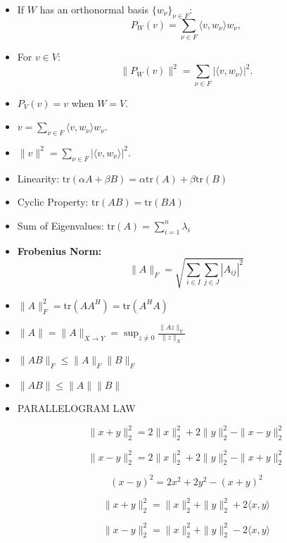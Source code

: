 \documentclass{article}
\begin{document}
\begin{itemize}
 \item If \( W \) has an orthonormal basis \( \{ w_\nu \}_{\nu \in F} \):
    \[
    P_W(v) = \sum_{\nu \in F} \langle v, w_\nu \rangle w_\nu,
    \]

 \item For \( v \in V \):
    \[
    \| P_W(v) \|^2 = \sum_{\nu \in F} |\langle v, w_\nu \rangle|^2.
    \]

 \item $P_V(v) = v$ when $W = V$.

 \item $v = \sum_{\nu \in F} \langle v, w_\nu \rangle w_\nu$.

 \item $\| v \|^2 = \sum_{\nu \in F} |\langle v, w_\nu \rangle|^2$.

 \item Linearity: $\text{tr}(\alpha A + \beta B) = \alpha \text{tr}(A) + \beta \text{tr}(B)$
    \item Cyclic Property: $\text{tr}(AB) = \text{tr}(BA)$
    \item Sum of Eigenvalues: $\text{tr}(A) = \sum_{i=1}^{n} \lambda_i$
 
\item \textbf{Frobenius Norm:}
    \[
    \| A \|_F = \sqrt{\sum_{i \in I} \sum_{j \in J} |A_{ij}|^2}
    \]

 \item 
    $
    \| A \|_F^2 = \text{tr}(AA^H) = \text{tr}(A^H A)
   $

\item 
$
\|A\| = \|A\|_{X \rightarrow Y} = \sup_{z \neq 0} \frac{\|Az\|_Y}{\|z\|_X}
$

\item 
$
\|AB\|_F \leq \|A\|_F \|B\|_F
$

\item $
\|AB\| \leq \|A\| \|B\|
$


\item PARALLELOGRAM LAW

\[
\|x + y\|^2_2 = 2 \|x\|^2_2 + 2 \|y\|^2_2 - \|x - y\|^2_2
\]

\[
\|x - y\|^2_2 = 2 \|x\|^2_2 + 2 \|y\|^2_2 - \|x + y\|^2_2
\]

\[
(x - y)^2 = 2x^2 + 2y^2 - (x + y)^2
\]

\[ \|x + y\|_2^2 = \|x\|_2^2 + \|y\|_2^2 + 2 \langle x, y \rangle \]

\[ \|x - y\|_2^2 = \|x\|_2^2 + \|y\|_2^2 - 2 \langle x, y \rangle \]


\end{itemize}
\end{document}
